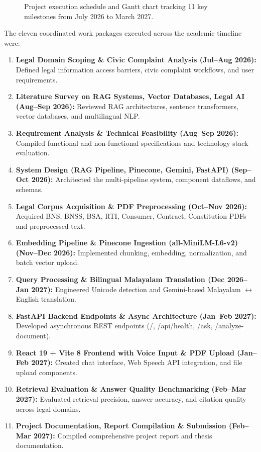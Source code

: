 \documentclass[12pt,a4paper]{report}
\begin{document}
\begin{figure}[H]
    \centering
    \caption{Project execution schedule and Gantt chart tracking 11 key milestones from July 2026 to March 2027.}
    \label{fig:project_gantt}
\end{figure}

The eleven coordinated work packages executed across the academic timeline were:
\begin{enumerate}
    \item \textbf{Legal Domain Scoping \& Civic Complaint Analysis (Jul--Aug 2026):} Defined legal information access barriers, civic complaint workflows, and user requirements.
    \item \textbf{Literature Survey on RAG Systems, Vector Databases, Legal AI (Aug--Sep 2026):} Reviewed RAG architectures, sentence transformers, vector databases, and multilingual NLP.
    \item \textbf{Requirement Analysis \& Technical Feasibility (Aug--Sep 2026):} Compiled functional and non-functional specifications and technology stack evaluation.
    \item \textbf{System Design (RAG Pipeline, Pinecone, Gemini, FastAPI) (Sep--Oct 2026):} Architected the multi-pipeline system, component dataflows, and schemas.
    \item \textbf{Legal Corpus Acquisition \& PDF Preprocessing (Oct--Nov 2026):} Acquired BNS, BNSS, BSA, RTI, Consumer, Contract, Constitution PDFs and preprocessed text.
    \item \textbf{Embedding Pipeline \& Pinecone Ingestion (all-MiniLM-L6-v2) (Nov--Dec 2026):} Implemented chunking, embedding, normalization, and batch vector upload.
    \item \textbf{Query Processing \& Bilingual Malayalam Translation (Dec 2026--Jan 2027):} Engineered Unicode detection and Gemini-based Malayalam $\leftrightarrow$ English translation.
    \item \textbf{FastAPI Backend Endpoints \& Async Architecture (Jan--Feb 2027):} Developed asynchronous REST endpoints (/, /api/health, /ask, /analyze-document).
    \item \textbf{React 19 + Vite 8 Frontend with Voice Input \& PDF Upload (Jan--Feb 2027):} Created chat interface, Web Speech API integration, and file upload components.
    \item \textbf{Retrieval Evaluation \& Answer Quality Benchmarking (Feb--Mar 2027):} Evaluated retrieval precision, answer accuracy, and citation quality across legal domains.
    \item \textbf{Project Documentation, Report Compilation \& Submission (Feb--Mar 2027):} Compiled comprehensive project report and thesis documentation.
\end{enumerate}
\end{document}

